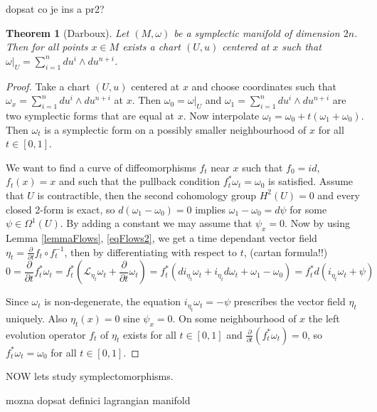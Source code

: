 \documentclass{article}
\newtheorem{theorem}{Theorem}
\theoremstyle{definition}
\begin{document}
dopsat co je ins a pr2?

\begin{theorem}[Darboux]
    Let $(M,\omega)$ be a symplectic manifold of dimension $2n$. Then for all points $x \in M$ exists a chart $(U,u)$ centered at $x$ such that $\omega |_U = \sum_{i=1}^{n} du^i \wedge du^{n+i}$.
\end{theorem}

\begin{proof}
    Take a chart $(U,u)$ centered at $x$ and choose coordinates such that $\omega_x = \sum_{i=1}^{n} du^i \wedge du^{n+i}$ at $x$. Then $\omega_0 = \omega |_U$ and $\omega_1 = \sum_{i=1}^{n} du^i \wedge du^{n+i}$ are two symplectic forms that are equal at $x$. Now interpolate $\omega_t = \omega_0 + t(\omega_1 + \omega_0)$. Then $\omega_t$ is a symplectic form on a possibly smaller neighbourhood of $x$ for all $t \in [0,1]$.

    We want to find a curve of diffeomorphisms $f_t$ near $x$ such that $f_0 = id$, $f_t(x) = x$ and such that the pullback condition $f^*_t \omega_t = \omega_0$ is satisfied. Assume that $U$ is contractible, then the second cohomology group $H^2(U) = 0$ and every closed 2-form is exact, so $d(\omega_1 - \omega_0) = 0$ implies $\omega_1-\omega_0 = d \psi$ for some $\psi \in \Omega^1(U)$. By adding a constant we may assume that $\psi_x = 0$. Now by using Lemma \ref{lemmaFlows}, \eqref{eqFlows2}, we get a time dependant vector field $\eta_t = \frac{\partial}{\partial t}f_t \circ f^{-1}_t$, then by differentiating with respect to $t$, (cartan formula!!)
    \begin{equation*}
        0=\frac{\partial}{\partial t} f_t^* \omega_t=f_t^*\left(\mathcal{L}_{\eta_t} \omega_t+\frac{\partial}{\partial t} \omega_t \right) = f_t^*\left(d i_{\eta_t} \omega_t+i_{\eta_t} d \omega_t+\omega_1-\omega_0\right)=f_t^* d\left(i_{\eta_t}\omega_t + \psi\right)
    \end{equation*}

    Since $\omega_t$ is non-degenerate, the equation $i_{\eta_t}\omega_t = -\psi$ prescribes the vector field $\eta_t$ uniquely. Also $\eta_t(x) = 0$ sine $\psi_x = 0$. On some neighbourhood of $x$ the left evolution operator $f_t$ of $\eta_t$ exists for all $t \in [0,1]$ and $\frac{\partial}{\partial t}(f^*_t\omega_t) = 0$, so $f_t^*\omega_t = \omega_0$ for all $t \in [0,1]$.
\end{proof}

NOW lets study symplectomorphisms.

mozna dopsat definici lagrangian manifold
\end{document}
